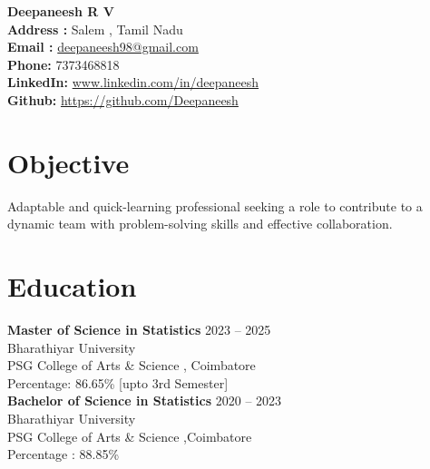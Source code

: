 \documentclass[a4paper,11pt]{article}
\begin{document}
	
	\begin{flushleft}
		{\LARGE \textbf{Deepaneesh R V}} \\
		\textbf{Address :} Salem , Tamil Nadu \\
		\textbf{Email :} \url{deepaneesh98@gmail.com}\\
		\textbf{Phone:} 7373468818 \\
		\textbf{LinkedIn:} \url{www.linkedin.com/in/deepaneesh} \\
		\textbf{Github:} \url{https://github.com/Deepaneesh} \\
	\end{flushleft}
	
	\section*{Objective}
	Adaptable and quick-learning professional seeking a role to contribute to a dynamic team with problem-solving skills and effective collaboration.
	
	\section*{Education}
	\noindent
	\textbf{Master of Science in Statistics} \hfill 2023 -- 2025 \\
	Bharathiyar University \\
	PSG College of Arts \& Science , Coimbatore \\
	 Percentage: 86.65\% [upto 3rd Semester] \\[0.1mm]
	
	\textbf{Bachelor of Science in Statistics} \hfill 2020 -- 2023 \\
	Bharathiyar University \\
	PSG College of Arts \& Science ,Coimbatore\\
	Percentage : 88.85\% \\[0.01mm]
	
\end{document}
